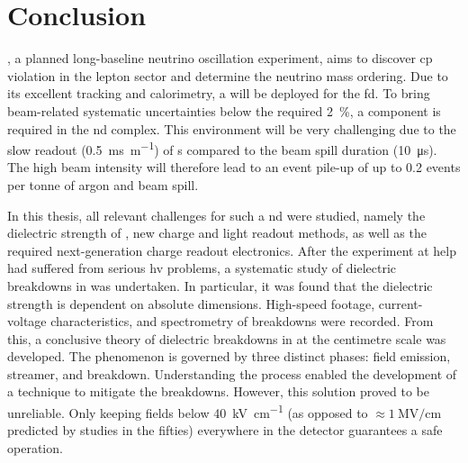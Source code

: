 \chapter{Conclusion}
\label{chap:conclusion}

\dune{}, a planned long-baseline neutrino oscillation experiment, aims to discover \gls{cp} violation in the lepton sector and determine the neutrino mass ordering.
Due to its excellent tracking and calorimetry, a \lartpc{} will be deployed for the \gls{fd}.
To bring beam-related systematic uncertainties below the required \SI{2}{\percent}, a \lartpc{} component is required in the \gls{nd} complex.
This environment will be very challenging due to the slow readout (\SI{0.5}{\milli\second\per\metre}) of \lartpc{}s compared to the beam spill duration (\SI{10}{\micro\second}).
The high beam intensity will therefore lead to an event pile-up of up to \num{0.2} events per tonne of argon and beam spill.

In this thesis, all relevant challenges for such a \gls{nd} \lartpc{} were studied, namely the dielectric strength of \lar{}, new charge and light readout methods, as well as the required next-generation charge readout electronics.
After the \AT{} experiment at \gls{help} had suffered from serious \gls{hv} problems, a systematic study of dielectric breakdowns in \lar{} was undertaken.
In particular, it was found that the dielectric strength is dependent on absolute dimensions.
High-speed footage, current-voltage characteristics, and spectrometry of breakdowns were recorded.
From this, a conclusive theory of dielectric breakdowns in \lar{} at the centimetre scale was developed.
The phenomenon is governed by three distinct phases: field emission, streamer, and breakdown.
Understanding the process enabled the development of a technique to mitigate the breakdowns.
However, this solution proved to be unreliable.
Only keeping fields below \SI{40}{\kilo\volt\per\centi\metre} (as opposed to $\approx \SI{1}{\mega\volt\per\centi\metre}$ predicted by studies in the fifties) everywhere in the detector guarantees a safe operation.

